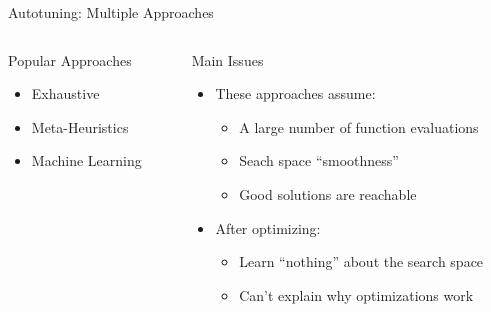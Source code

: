 \documentclass[10pt, compress, aspectratio=169, xcolor={table,usenames,dvipsnames}]{beamer}
\begin{document}
\begin{frame}[label={sec:orgd5db951}]{Autotuning: Multiple Approaches}
\begin{columns}
\begin{column}{0.5\columnwidth}
\begin{block}{Popular Approaches}
\footnotesize
\begin{itemize}
\item \colorbox{red!25}{Exhaustive}
\item \colorbox{green!25}{Meta-Heuristics}
\item \colorbox{cyan!25}{Machine Learning}
\end{itemize}
\normalsize

\vspace{-.4cm}


\end{block}
\end{column}

\begin{column}{0.5\columnwidth}
\begin{block}{Main Issues}
\begin{itemize}
\item These approaches \alert{assume}:
\begin{itemize}
\item A \alert{large number of function evaluations}
\item Seach space \alert{``smoothness''}
\item Good solutions are \alert{reachable}
\end{itemize}
\item After optimizing:
\begin{itemize}
\item \alert{Learn ``nothing''} about the search space
\item \alert{Can't explain} why optimizations work
\end{itemize}
\end{itemize}
\end{block}
\end{column}
\end{columns}
\end{frame}
\end{document}
